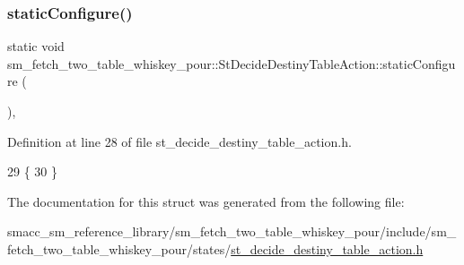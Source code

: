 \subsubsection{\texorpdfstring{static\+Configure()}{staticConfigure()}}
{\footnotesize\ttfamily static void sm\+\_\+fetch\+\_\+two\+\_\+table\+\_\+whiskey\+\_\+pour\+::\+St\+Decide\+Destiny\+Table\+Action\+::static\+Configure (\begin{DoxyParamCaption}{ }\end{DoxyParamCaption})\hspace{0.3cm}{\ttfamily [inline]}, {\ttfamily [static]}}



Definition at line 28 of file st\+\_\+decide\+\_\+destiny\+\_\+table\+\_\+action.\+h.


\begin{DoxyCode}
29         \{
30         \}
\end{DoxyCode}


The documentation for this struct was generated from the following file\+:\begin{DoxyCompactItemize}
\item 
smacc\+\_\+sm\+\_\+reference\+\_\+library/sm\+\_\+fetch\+\_\+two\+\_\+table\+\_\+whiskey\+\_\+pour/include/sm\+\_\+fetch\+\_\+two\+\_\+table\+\_\+whiskey\+\_\+pour/states/\hyperlink{st__decide__destiny__table__action_8h}{st\+\_\+decide\+\_\+destiny\+\_\+table\+\_\+action.\+h}\end{DoxyCompactItemize}
